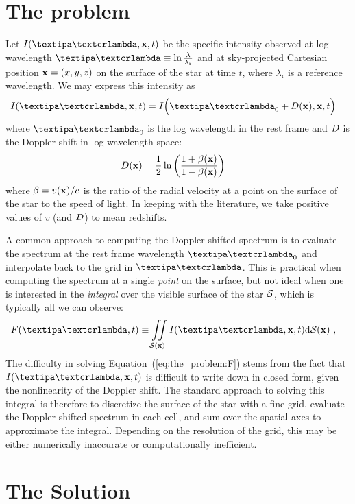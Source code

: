 \documentclass[modern]{aastex631}
\begin{document}
\section{The problem}
\label{sec:the_problem}
%
Let $I(\lnlam, \x, t)$ be the specific intensity observed at log wavelength $\lnlam \equiv \ln\frac{\lambda}{\lambda_\mathrm{r}}$ and at sky-projected Cartesian position ${\mathbf{x}} = (x, y, z)$ on the surface of the star at time $t$, where $\lambda_\mathrm{r}$ is a reference wavelength.
We may express this intensity as
%
\begin{align}
    \label{eq:the_problem:Ixi}
    I(\lnlam, \x, t) & =
    I\Big(\lnlam_0 + \D(\x), \x, t\Big)
\end{align}
%
where $\lnlam_0$ is the log wavelength in the rest frame and $D$ is the Doppler shift in log wavelength space:
%
\begin{align}
    \label{eq:the_problem:D}
    D({\mathbf{x}})
     & =
    \frac{1}{2}\ln\left(
    \frac{1 + \beta({\mathbf{x}})}{1 - \beta({\mathbf{x}})}
    \right)
\end{align}
%
where $\beta = v({\mathbf{x}}) / c$ is the ratio of the radial velocity at a point on the surface of the star to the speed of light.
In keeping with the literature, we take positive values of $v$ (and $D$) to mean redshifts.

A common approach to computing the Doppler-shifted spectrum is to evaluate the spectrum at the rest frame wavelength $\lnlam_0$ and interpolate back to the grid in $\lnlam$. 
This is practical when computing the spectrum at a single \emph{point} on the surface, but not ideal when one is interested in the \emph{integral} over the visible surface of the star $\mathcal{S}$, which is typically all we can observe:
%
\begin{align}
    \label{eq:the_problem:F}
    F(\lnlam, t)
     & \equiv
    \iint\limits_{\Surf(\x)}
    I(\lnlam, \x, t)
    \mathrm{d}{\Surf(\x)}
    \quad,
\end{align}
%
The difficulty in solving Equation~(\ref{eq:the_problem:F}) stems from the fact that $I(\lnlam, \x, t)$ is difficult to write down in closed form, given the nonlinearity of the Doppler shift.
The standard approach to solving this integral is therefore to discretize the surface of the star with a fine grid, evaluate the Doppler-shifted spectrum in each cell, and sum over the spatial axes to approximate the integral. 
Depending on the resolution of the grid, this may be either numerically inaccurate or computationally inefficient.

\section{The Solution}
\label{sec:the_solution}
\end{document}
